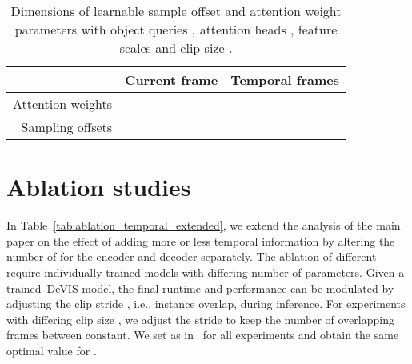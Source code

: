 \documentclass[runningheads]{llncs}
\newcommand{\evis}{\mbox{DeVIS}}
\newcommand{\ie}{i.e.}
\begin{document}
\begin{table*}
\centering
\caption{
Dimensions of learnable sample offset and attention weight parameters with object queries , attention heads , feature scales  and clip size .
    }

\label{tab:learn_offset_and_weight_params_dims}

\begin{tabular}{r | c | c}
\toprule
                    & Current frame & Temporal frames \\
\midrule

Attention weights   &  &   \\
Sampling offsets    &  &  \\

\bottomrule
\end{tabular}
\end{table*} 
\section{Ablation studies}

\label{sec:ablation_appendix}

In Table~\ref{tab:ablation_temporal_extended}, we extend the analysis of the main paper on the effect of adding more or less temporal information by altering the number of  for the encoder and decoder separately.
The ablation of different  require individually trained models with differing number of parameters.
Given a trained~\evis{} model, the final runtime and performance can be modulated by adjusting the clip stride , \ie, instance overlap, during inference.
For experiments with differing clip size , we adjust the stride to keep the number of overlapping frames between constant.
We set  as in~\cite{deformable_detr} for all experiments and obtain the same optimal value for .
\end{document}
